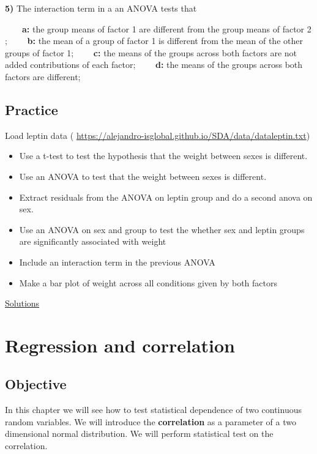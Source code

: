 \documentclass[
]{book}
\begin{document}
\textbf{5)} The interaction term in a an ANOVA tests that

\textbf{\(\qquad\)a:} the group means of factor 1 are different from the group means of factor 2 ;
\textbf{\(\qquad\)b:} the mean of a group of factor 1 is different from the mean of the other groups of factor 1;
\textbf{\(\qquad\)c:} the means of the groups across both factors are not added contributions of each factor;
\textbf{\(\qquad\)d:} the means of the groups across both factors are different;

\hypertarget{practice-7}{%
\section{Practice}\label{practice-7}}

Load leptin data (
\url{https://alejandro-isglobal.github.io/SDA/data/dataleptin.txt})

\begin{itemize}
\item
  Use a t-test to test the hypothesis that the weight between sexes is different.
\item
  Use an ANOVA to test that the weight between sexes is different.
\item
  Extract residuals from the ANOVA on leptin group and do a second anova on sex.
\item
  Use an ANOVA on sex and group to test the whether sex and leptin groups are significantly associated with weight
\item
  Include an interaction term in the previous ANOVA
\item
  Make a bar plot of weight across all conditions given by both factors
\end{itemize}

\href{https://colab.research.google.com/drive/1K2SlNEd5hNn3lI4XnKsgj1tDeXVyprVE?usp=sharing}{Solutions}

\hypertarget{regression-and-correlation}{%
\chapter{Regression and correlation}\label{regression-and-correlation}}

\hypertarget{objective-13}{%
\section{Objective}\label{objective-13}}

In this chapter we will see how to test statistical dependence of two continuous random variables. We will introduce the \textbf{correlation} as a parameter of a two dimensional normal distribution. We will perform statistical test on the correlation.
\end{document}
